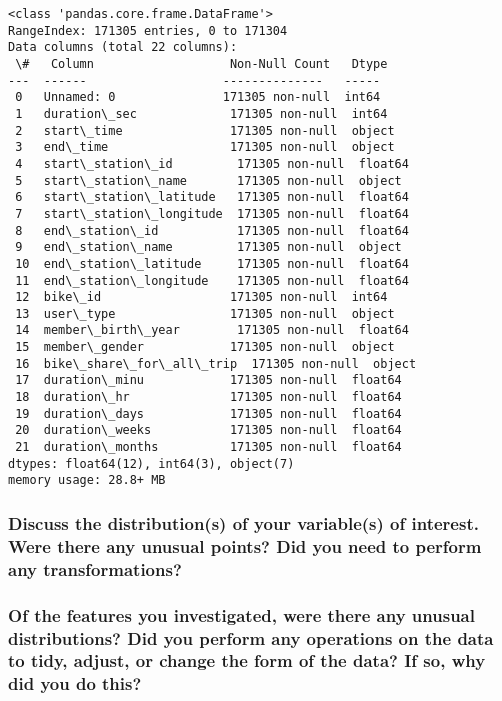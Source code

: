 \documentclass[11pt]{article}
\begin{document}
    \begin{Verbatim}[commandchars=\\\{\}]
<class 'pandas.core.frame.DataFrame'>
RangeIndex: 171305 entries, 0 to 171304
Data columns (total 22 columns):
 \#   Column                   Non-Null Count   Dtype
---  ------                   --------------   -----
 0   Unnamed: 0               171305 non-null  int64
 1   duration\_sec             171305 non-null  int64
 2   start\_time               171305 non-null  object
 3   end\_time                 171305 non-null  object
 4   start\_station\_id         171305 non-null  float64
 5   start\_station\_name       171305 non-null  object
 6   start\_station\_latitude   171305 non-null  float64
 7   start\_station\_longitude  171305 non-null  float64
 8   end\_station\_id           171305 non-null  float64
 9   end\_station\_name         171305 non-null  object
 10  end\_station\_latitude     171305 non-null  float64
 11  end\_station\_longitude    171305 non-null  float64
 12  bike\_id                  171305 non-null  int64
 13  user\_type                171305 non-null  object
 14  member\_birth\_year        171305 non-null  float64
 15  member\_gender            171305 non-null  object
 16  bike\_share\_for\_all\_trip  171305 non-null  object
 17  duration\_minu            171305 non-null  float64
 18  duration\_hr              171305 non-null  float64
 19  duration\_days            171305 non-null  float64
 20  duration\_weeks           171305 non-null  float64
 21  duration\_months          171305 non-null  float64
dtypes: float64(12), int64(3), object(7)
memory usage: 28.8+ MB
    \end{Verbatim}

    \hypertarget{discuss-the-distributions-of-your-variables-of-interest.-were-there-any-unusual-points-did-you-need-to-perform-any-transformations}{%
\subsubsection{Discuss the distribution(s) of your variable(s) of
interest. Were there any unusual points? Did you need to perform any
transformations?}\label{discuss-the-distributions-of-your-variables-of-interest.-were-there-any-unusual-points-did-you-need-to-perform-any-transformations}}

\hypertarget{of-the-features-you-investigated-were-there-any-unusual-distributions-did-you-perform-any-operations-on-the-data-to-tidy-adjust-or-change-the-form-of-the-data-if-so-why-did-you-do-this}{%
\subsubsection{Of the features you investigated, were there any unusual
distributions? Did you perform any operations on the data to tidy,
adjust, or change the form of the data? If so, why did you do
this?}\label{of-the-features-you-investigated-were-there-any-unusual-distributions-did-you-perform-any-operations-on-the-data-to-tidy-adjust-or-change-the-form-of-the-data-if-so-why-did-you-do-this}}
\end{document}
